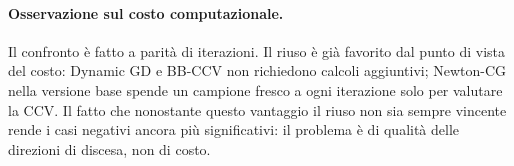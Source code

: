 \documentclass[a4paper,12pt]{article}
\numberwithin{equation}{section}
\numberwithin{figure}{section}
\numberwithin{table}{section}
\begin{document}
\paragraph{Osservazione sul costo computazionale.}
Il confronto è fatto a parità di iterazioni. Il riuso è già favorito dal
punto di vista del costo: Dynamic GD e BB-CCV non richiedono calcoli
aggiuntivi; Newton-CG nella versione base spende un campione fresco a ogni
iterazione solo per valutare la CCV. Il fatto che nonostante questo vantaggio
il riuso non sia sempre vincente rende i casi negativi ancora più significativi:
il problema è di qualità delle direzioni di discesa, non di costo.



\end{document}
